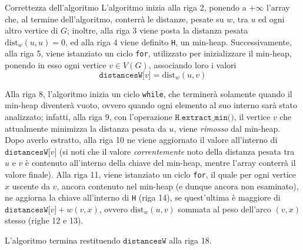 \documentclass[a4paper, 12pt]{report}
\begin{document}
    \begin{framedobs}{Correttezza dell'algoritmo}
        L'algoritmo inizia alla riga 2, ponendo a $+ \infty$ l'array che, al termine dell'algoritmo, conterrà le distanze, pesate su $w$, tra $u$ ed ogni altro vertice di $G$; inoltre, alla riga 3 viene posta la distanza pesata $\mathrm{dist}_w(u, u) = 0$, ed alla riga 4 viene definito \texttt{H}, un min-heap. Successivamente, alla riga 5, viene istanziato un ciclo \texttt{for}, utilizzato per inizializzare il min-heap, ponendo in esso ogni vertice $v \in V(G)$, associando loro i valori $$\texttt{distancesW[}v\texttt{]} = \mathrm{dist}_w(u, v)$$

        Alla riga 8, l'algoritmo inizia un ciclo \texttt{while}, che terminerà solamente quando il min-heap diventerà vuoto, ovvero quando ogni elemento al suo interno sarà stato analizzato; infatti, alla riga 9, con l'operazione $\texttt{H.extract\_min()}$, il vertice $v$ che attualmente minimizza la distanza pesata da $u$, viene \textit{rimosso} dal min-heap. Dopo averlo estratto, alla riga 10 ne viene aggiornato il valore all'interno di $\texttt{distancesW[}v\texttt{]}$ (si noti che il valore \textit{correntemente} noto della distanza pesata tra $u$ e $v$ è contenuto all'interno della chiave del min-heap, mentre l'array conterrà il valore finale). Alla riga 11, viene istanziato un ciclo \texttt{for}, il quale per ogni vertice $x$ uscente da $v$, ancora contenuto nel min-heap (e dunque ancora non esaminato), ne aggiorna la chiave all'interno di \texttt{H} (riga 14), se quest'ultima è maggiore di $\texttt{distancesW[}v \texttt{]} + w(v, x)$, ovvero $\mathrm{dist}_w(u, v)$ sommata al peso dell'arco $(v, x)$ stesso (righe 12 e 13).

        L'algoritmo termina restituendo $\texttt{distancesW}$ alla riga 18.
    \end{framedobs}
\end{document}

